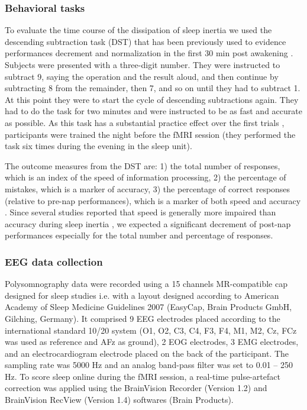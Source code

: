 \subsubsection*{Behavioral tasks}
To evaluate the time course of the dissipation of sleep inertia we used the descending subtraction task (DST) that has been previously used to evidence performances decrement and normalization in the first 30 min post awakening \citep{dinges_assessing_1985, evans_recovery_1975, stampi_ultrashort_1990}. Subjects were presented with a three-digit number. They were instructed to subtract 9, saying the operation and the result aloud, and then continue by subtracting 8 from the remainder, then 7, and so on until they had to subtract 1. At this point they were to start the cycle of descending subtractions again. They had to do the task for two minutes and were instructed to be as fast and accurate as possible. As this task has a substantial practice effect over the first trials \citep{dinges_assessing_1985}, participants were trained the night before the fMRI session (they performed the task six times during the evening in the sleep unit).

The outcome measures from the DST are: 1) the total number of responses, which is an index of the speed of information processing, 2) the percentage of mistakes, which is a marker of accuracy, 3) the percentage of correct responses (relative to pre-nap performances), which is a marker of both speed and accuracy \citep{dinges_assessing_1985}. Since several studies reported that speed is generally more impaired than accuracy during sleep inertia \citep{trotti_waking_2016}, we expected a significant decrement of post-nap performances especially for the total number and percentage of responses.

\subsubsection*{EEG data collection}
Polysomnography data were recorded using a 15 channels MR-compatible cap designed for sleep studies i.e. with a layout designed according to American Academy of Sleep Medicine Guidelines 2007 (EasyCap, Brain Products GmbH, Gilching, Germany). It comprised 9 EEG electrodes placed according to the international standard 10/20 system (O1, O2, C3, C4, F3, F4, M1, M2, Cz, FCz was used as reference and AFz as ground), 2 EOG electrodes, 3 EMG electrodes, and an electrocardiogram electrode placed on the back of the participant. The sampling rate was 5000 Hz and an analog band-pass filter was set to 0.01 – 250 Hz. To score sleep online during the fMRI session, a real-time pulse-artefact correction was applied using the BrainVision Recorder (Version 1.2) and BrainVision RecView (Version 1.4) softwares (Brain Products).

